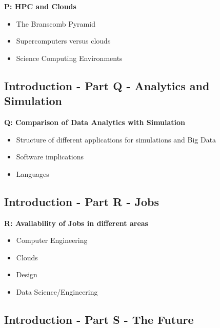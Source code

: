 \textbf{P: HPC and Clouds}
\begin{itemize}
\item The Branscomb Pyramid
\item Supercomputers versus clouds
\item Science Computing Environments
\end{itemize} 

\subsection{Introduction - Part Q - Analytics and Simulation}\label{s:cloud-fundamentals-q}


\textbf{Q: Comparison of Data Analytics with Simulation}
\begin{itemize}
\item Structure of different applications for simulations and Big Data
\item Software implications
\item Languages
\end{itemize}  

\subsection{Introduction - Part R - Jobs}\label{s:cloud-fundamentals-r}


\textbf{R: Availability of Jobs in different areas}
\begin{itemize}
\item Computer Engineering
\item Clouds
\item Design
\item Data Science/Engineering
\end{itemize} 

\subsection{Introduction - Part S - The Future}\label{s:cloud-fundamentals-s}


